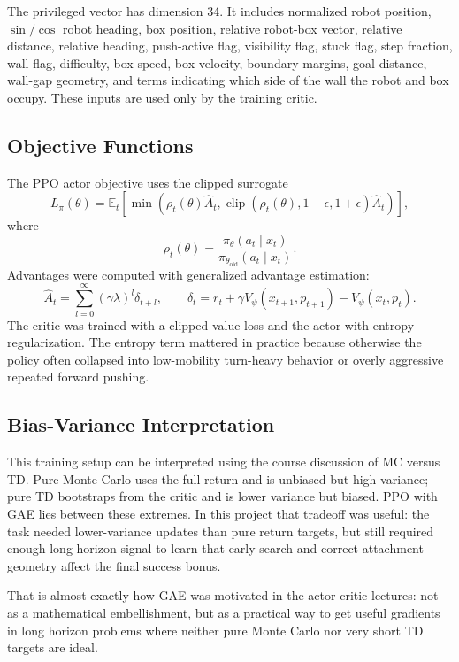 \documentclass[11pt, oneside]{article}   	%
\begin{document}
The privileged vector has dimension 34. It includes normalized robot position,
\(\sin/\cos\) robot heading, box position, relative robot-box vector, relative distance,
relative heading, push-active flag, visibility flag, stuck flag, step fraction, wall flag,
difficulty, box speed, box velocity, boundary margins, goal distance, wall-gap geometry,
and terms indicating which side of the wall the robot and box occupy. These inputs are
used only by the training critic.

\subsection{Objective Functions}

The PPO actor objective uses the clipped surrogate
\[
  L_{\pi}(\theta)=
  \mathbb{E}_t\left[
    \min\left(
      \rho_t(\theta)\hat{A}_t,
      \operatorname{clip}(\rho_t(\theta),1-\epsilon,1+\epsilon)\hat{A}_t
    \right)
  \right],
\]
where
\[
  \rho_t(\theta)=
  \frac{\pi_\theta(a_t\mid x_t)}{\pi_{\theta_{\text{old}}}(a_t\mid x_t)}.
\]
Advantages were computed with generalized advantage estimation:
\[
  \hat{A}_t=
  \sum_{l=0}^{\infty}(\gamma\lambda)^l\delta_{t+l},
  \qquad
  \delta_t=r_t + \gamma V_\psi(x_{t+1},p_{t+1}) - V_\psi(x_t,p_t).
\]
The critic was trained with a clipped value loss and the actor with entropy
regularization. The entropy term mattered in practice because otherwise the policy often
collapsed into low-mobility turn-heavy behavior or overly aggressive repeated forward
pushing.

\subsection{Bias-Variance Interpretation}

This training setup can be interpreted using the course discussion of MC versus TD.
Pure Monte Carlo uses the full return and is unbiased but high variance; pure TD
bootstraps from the critic and is lower variance but biased. PPO with GAE lies between
these extremes. In this project that tradeoff was useful: the task needed lower-variance
updates than pure return targets, but still required enough long-horizon signal to learn
that early search and correct attachment geometry affect the final success bonus.

That is almost exactly how GAE was motivated in the actor-critic lectures: not as a
mathematical embellishment, but as a practical way to get useful gradients in long
horizon problems where neither pure Monte Carlo nor very short TD targets are ideal.
\end{document}
